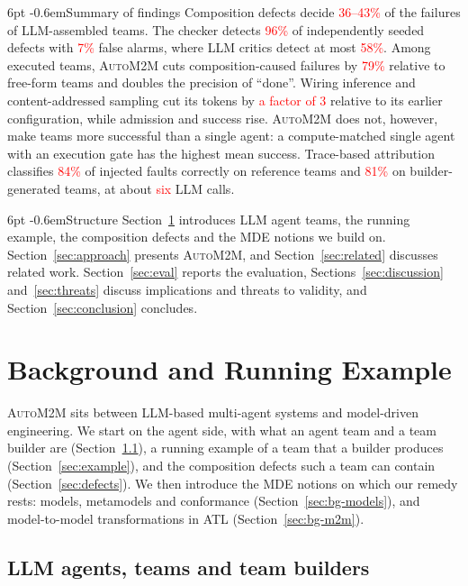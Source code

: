 \documentclass[pdflatex,sn-mathphys-num]{sn-jnl}
\makeatletter
\theoremstyle{thmstyleone}%
\theoremstyle{thmstyletwo}%
\theoremstyle{thmstylethree}%
\newcommand{\tbd}[1]{\textcolor{red}{#1}}
\newcommand{\auto}{\textsc{AutoM2M}}
\renewcommand\paragraph{\@startsection{paragraph}{4}{\z@}%
  {6pt \@plus 2pt \@minus 1pt}{-0.6em}{\normalfont\normalsize\bfseries}}
\makeatother
\begin{document}
\paragraph{Summary of findings} Composition defects decide \tbd{36--43\%} of
the failures of LLM-assembled teams. The checker detects \tbd{96\%} of
independently seeded defects with \tbd{7\%} false alarms, where LLM critics
detect at most \tbd{58\%}. Among executed teams, \auto{} cuts
composition-caused failures by \tbd{79\%} relative to free-form teams and
doubles the precision of ``done''. Wiring inference and content-addressed
sampling cut its tokens by \tbd{a factor of 3} relative to its earlier
configuration, while admission and success rise. \auto{} does not, however,
make teams more successful than a single agent: a compute-matched single agent
with an execution gate has the highest mean success. Trace-based attribution
classifies \tbd{84\%} of injected faults correctly on reference teams and
\tbd{81\%} on builder-generated teams, at about \tbd{six} LLM calls.

\paragraph{Structure} Section~\ref{sec:background} introduces LLM agent teams,
the running example, the composition defects and the MDE notions we build on.
Section~\ref{sec:approach} presents \auto{}, and Section~\ref{sec:related}
discusses related work. Section~\ref{sec:eval} reports the evaluation,
Sections~\ref{sec:discussion} and~\ref{sec:threats} discuss implications and
threats to validity, and Section~\ref{sec:conclusion} concludes.

\section{Background and Running Example}\label{sec:background}

\auto{} sits between LLM-based multi-agent systems and model-driven
engineering. We start on the agent side, with what an agent team and a team
builder are (Section~\ref{sec:bg-agents}), a running example of a team that a
builder produces (Section~\ref{sec:example}), and the composition defects such
a team can contain (Section~\ref{sec:defects}). We then introduce the MDE
notions on which our remedy rests: models, metamodels and conformance
(Section~\ref{sec:bg-models}), and model-to-model transformations in ATL
(Section~\ref{sec:bg-m2m}).

\subsection{LLM agents, teams and team builders}\label{sec:bg-agents}
\end{document}
